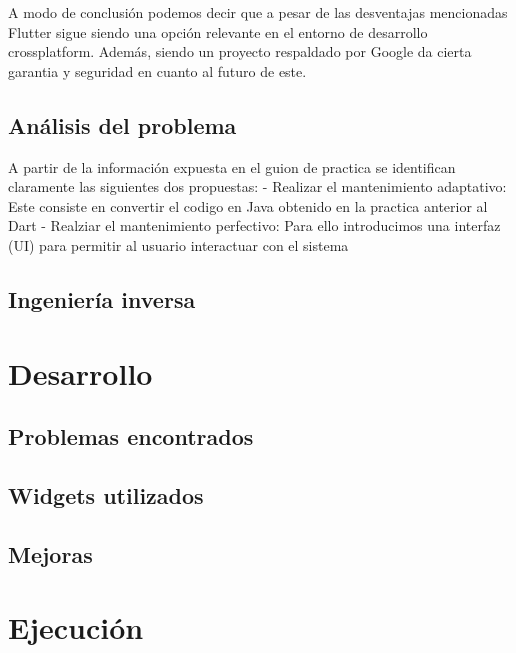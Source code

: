\documentclass{article}
\begin{document}
A modo de conclusión podemos decir que a pesar de las desventajas mencionadas Flutter sigue siendo una opción relevante en el entorno de desarrollo crossplatform. Además, siendo un proyecto
respaldado por Google da cierta garantia y seguridad en cuanto al futuro de este. 

\subsection{Análisis del problema}
A partir de la información expuesta en el guion de practica se identifican claramente las siguientes dos propuestas:
- Realizar el mantenimiento adaptativo:
    Este consiste en convertir el codigo en Java obtenido en la practica anterior al Dart
- Realziar el mantenimiento perfectivo:
    Para ello introducimos una interfaz (UI) para permitir al usuario interactuar con el sistema



\subsection{Ingeniería inversa}


\newpage
\section{Desarrollo}
\subsection{Problemas encontrados}

\subsection{Widgets utilizados}

\subsection{Mejoras}



\newpage
\section{Ejecución}
\end{document}
